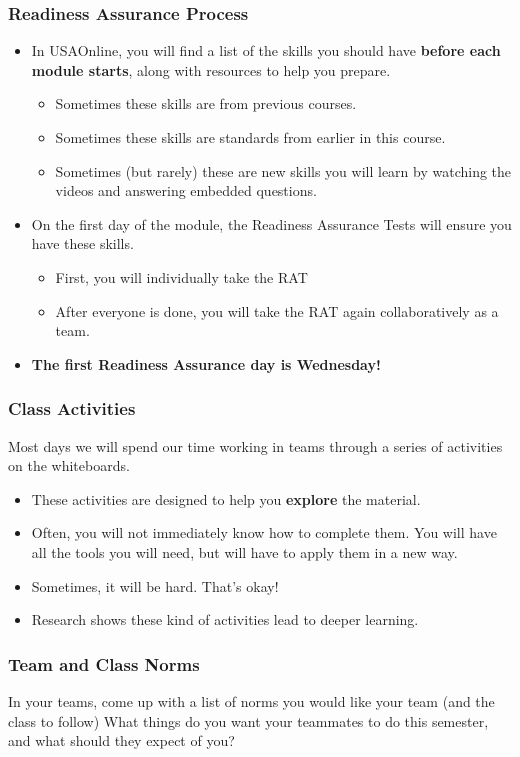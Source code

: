 \documentclass[aspectration=1610]{beamer}
\begin{document}
  \begin{frame}\frametitle{Readiness Assurance Process}
  \begin{itemize}
  \item In USAOnline, you will find a list of the skills you should have {\bf before each module starts}, along with resources to help you prepare.
  \begin{itemize}
  \item Sometimes these skills are from previous courses.
  \item Sometimes these skills are standards from earlier in this course.
    \item Sometimes (but rarely) these are new skills you will learn by watching the videos and answering embedded questions.
  \end{itemize}
  \pause \item On the first day of the module, the Readiness Assurance Tests will ensure you have these skills.
  \begin{itemize}
  \item First, you will individually take the RAT
  \item After everyone is done, you will take the RAT again collaboratively as a team.
  \end{itemize}
  \item {\bf The first Readiness Assurance day is Wednesday!}
  \end{itemize}
  \end{frame}
  
  
\begin{frame}\frametitle{Class Activities}
Most days we will spend our time working in teams through a series of activities on the whiteboards.
\begin{itemize}
\item These activities are designed to help you \textbf{explore} the material.
\item Often, you will not immediately know how to complete them.  You will have all the tools you will need, but will have to apply them in a new way.
\item Sometimes, it will be hard.  That's okay!
\item Research shows these kind of activities lead to deeper learning.
\end{itemize}

\end{frame}
  

\begin{frame}\frametitle{Team and Class Norms}

In your teams, come up with a list of norms you would like your team (and the class to follow)
\vfill
What things do you want your teammates to do this semester, and what should they expect of you?
\vfill
\end{frame}
\end{document}
